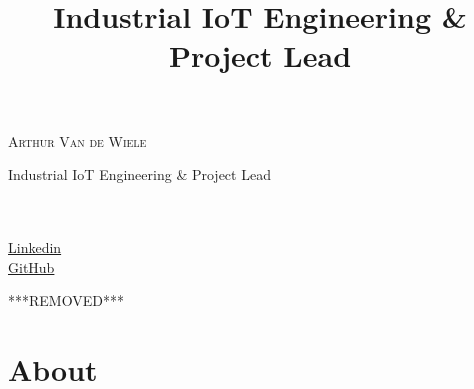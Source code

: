 \documentclass[10pt,a4paper]{moderncv}
\title{Industrial IoT Engineering \& Project Lead}
\newcommand*{\makenameplate}[0]{
  {\color{color1}\Huge\scshape Arthur Van de Wiele}
  \vspace{0.5em}
  {\par\color{color2}\Large Industrial IoT Engineering \& Project Lead}
}
\begin{document}
\begin{minipage}{0.70\textwidth}
  \makenameplate
\end{minipage}
\begin{minipage}{0.30\textwidth}
  \emailsymbol\hspace{1em} \\
  \mobilephonesymbol\hspace{1em }\\
  \faLinkedin\hspace{1em} \href{https://www.linkedin.com/in/arthur-van-de-wiele/}{Linkedin}\\
  \faGithubSquare\hspace{1em} \href{https://www.linkedin.com/in/arthur-van-de-wiele/}{GitHub}
\end{minipage}

\vspace{1em}
{\par\color{color2}***REMOVED***}

\section{About}
\end{document}
